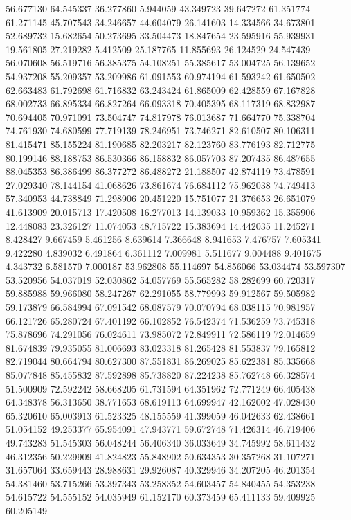 56.677130
64.545337
36.277860
5.944059
43.349723
39.647272
61.351774
61.271145
45.707543
34.246657
44.604079
26.141603
14.334566
34.673801
52.689732
15.682654
50.273695
33.504473
18.847654
23.595916
55.939931
19.561805
27.219282
5.412509
25.187765
11.855693
26.124529
24.547439
56.070608
56.519716
56.385375
54.108251
55.385617
53.004725
56.139652
54.937208
55.209357
53.209986
61.091553
60.974194
61.593242
61.650502
62.663483
61.792698
61.716832
63.243424
61.865009
62.428559
67.167828
68.002733
66.895334
66.827264
66.093318
70.405395
68.117319
68.832987
70.694405
70.971091
73.504747
74.817978
76.013687
71.664770
75.338704
74.761930
74.680599
77.719139
78.246951
73.746271
82.610507
80.106311
81.415471
85.155224
81.190685
82.203217
82.123760
83.776193
82.712775
80.199146
88.188753
86.530366
86.158832
86.057703
87.207435
86.487655
88.045353
86.386499
86.377272
86.488272
21.188507
42.874119
73.478591
27.029340
78.144154
41.068626
73.861674
76.684112
75.962038
74.749413
57.340953
44.738849
71.298906
20.451220
15.751077
21.376653
26.651079
41.613909
20.015713
17.420508
16.277013
14.139033
10.959362
15.355906
12.448083
23.326127
11.074053
48.715722
15.383694
14.442035
11.245271
8.428427
9.667459
5.461256
8.639614
7.366648
8.941653
7.476757
7.605341
9.422280
4.839032
6.491864
6.361112
7.009981
5.511677
9.004488
9.401675
4.343732
6.581570
7.000187
53.962808
55.114697
54.856066
53.034474
53.597307
53.520956
54.037019
52.030862
54.057769
55.565282
58.282699
60.720317
59.885988
59.966080
58.247267
62.291055
58.779993
59.912567
59.505982
59.173879
66.584994
67.091542
68.087579
70.070794
68.038115
70.981957
66.121726
65.280724
67.401192
66.102852
76.542374
71.536259
73.745318
75.878696
74.291056
76.024611
73.985072
72.849911
72.586119
72.014659
81.674839
79.935055
81.006693
83.023318
81.265428
81.553837
79.165812
82.719044
80.664794
80.627300
87.551831
86.269025
85.622381
85.335668
85.077848
85.455832
87.592898
85.738820
87.224238
85.762748
66.328574
51.500909
72.592242
58.668205
61.731594
64.351962
72.771249
66.405438
64.348378
56.313650
38.771653
68.619113
64.699947
42.162002
47.028430
65.320610
65.003913
61.523325
48.155559
41.399059
46.042633
62.438661
51.054152
49.253377
65.954091
47.943771
59.672748
71.426314
46.719406
49.743283
51.545303
56.048244
56.406340
36.033649
34.745992
58.611432
46.312356
50.229909
41.824823
55.848902
50.634353
30.357268
31.107271
31.657064
33.659443
28.988631
29.926087
40.329946
34.207205
46.201354
54.381460
53.715266
53.397343
53.258352
54.603457
54.840455
54.353238
54.615722
54.555152
54.035949
61.152170
60.373459
65.411133
59.409925
60.205149
